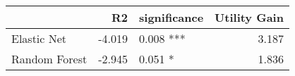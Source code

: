 \begin{tabular}{lrlr}
\toprule
{} &     R2 & significance &  Utility Gain \\
\midrule
Elastic Net   & -4.019 &    0.008 *** &         3.187 \\
Random Forest & -2.945 &      0.051 * &         1.836 \\
\bottomrule
\end{tabular}
